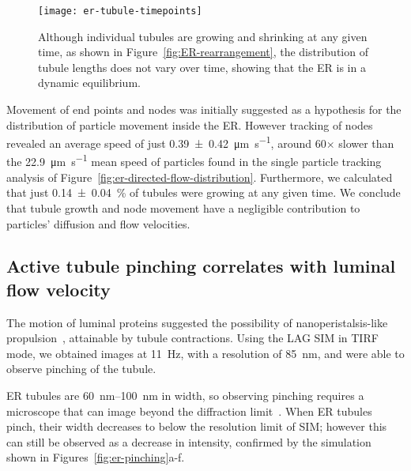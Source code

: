 \begin{figure}[htbp!]
\centering
\texttt{[image: er-tubule-timepoints]}
\caption[ER: Distribution of tubule length remains constant despite growing and shrinking of individual tubules]{Although individual tubules are growing and shrinking at any given time, as shown in Figure~\ref{fig:ER-rearrangement}, the distribution of tubule lengths does not vary over time, showing that the ER is in a dynamic equilibrium. } 
\label{fig:er-tubule-timepoints}
\end{figure}

Movement of end points and nodes was initially suggested as a hypothesis for the distribution of particle movement inside the ER. 
However tracking of nodes revealed an average speed of just \SI[separate-uncertainty=true]{0.39 \pm 0.42}{\micro\metre\per\second}, around 60$\times$ slower than the \SI{22.9}{\micro\metre\per\second} mean speed of particles found in the single particle tracking analysis of Figure~\ref{fig:er-directed-flow-distribution}. 
Furthermore, we calculated that just \SI[separate-uncertainty=true]{0.14 \pm 0.04}{\percent} of tubules were growing at any given time. 
We conclude that tubule growth and node movement have a negligible contribution to particles' diffusion and flow velocities. 


\subsection{Active tubule pinching correlates with luminal flow velocity}
The motion of luminal proteins suggested the possibility of nanoperistalsis-like propulsion~\cite{nadeem2014mathematical}, attainable by tubule contractions. 
Using the LAG SIM in TIRF mode, we obtained images at \SI{11}{\hertz}, with a resolution of \SI{85}{\nano\metre}, and were able to observe pinching of the tubule. 

ER tubules are \SIrange{60}{100}{\nano\metre} in width, so observing pinching requires a microscope that can image beyond the diffraction limit~\cite{lippincott1989rapid}. 
When ER tubules pinch, their width decreases to below the resolution limit of SIM; however this can still be observed as a decrease in intensity, confirmed by the simulation shown in Figures~\ref{fig:er-pinching}a-f. 

